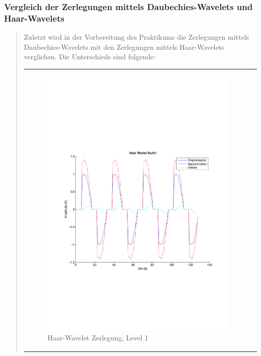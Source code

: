         \subsubsection{Vergleich der Zerlegungen mittels
        Daubechies-Wavelets und Haar-Wavelets}
        \begin{quote}
        
        Zuletzt wird in der Vorbereitung des Praktikums die Zerlegungen mittels
        Daubechies-Wavelets mit den Zerlegungen mittels Haar-Wavelets
        verglichen. Die Unterschiede sind folgende:
        
        \begin{center}
                \begin{tabular}{ll}
    
                \hspace{-8em}
                    \begin{minipage}{0.6\textwidth}
    
                        \begin{figure}[H]
                            \label{fig:}
                            \includegraphics[scale=0.4, trim = 2cm 6cm 1cm
                            7.5cm,
                            clip]{./Bilder/Termin8/Haar_Wavlet_lvl_1}
                            \caption{Haar-Wavelet Zerlegung, Level 1}
                        \end{figure}
    

\end{minipage}
\end{tabular}
\end{center}
\end{quote}

